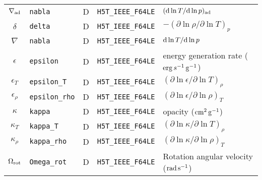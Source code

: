 \documentclass{article}
\newcommand{\diff}{\ensuremath{{\rm d}}}
\newcommand{\cm}{\ensuremath{{\rm cm}}}
\newcommand{\gram}{\ensuremath{{\rm g}}}
\newcommand{\second}{\ensuremath{{\rm s}}}
\newcommand{\erg}{\ensuremath{{\rm erg}}}
\begin{document}
\begin{table}[h!]
\begin{tabular}{|c|l|c|l|l|}
$\nabla_{\rm ad}$  & \texttt{nabla}        & D & \texttt{H5T\_IEEE\_F64LE} & $(\diff \ln T/\diff \ln p)_{\rm ad}$ \\
$\delta$      & \texttt{delta}            & D & \texttt{H5T\_IEEE\_F64LE} & $-(\partial \ln \rho/\partial \ln T)_{p}$  \\
$\nabla$          & \texttt{nabla}        & D & \texttt{H5T\_IEEE\_F64LE} & $\diff \ln T/\diff \ln p$ \\
$\epsilon$        & \texttt{epsilon}      & D &  \texttt{H5T\_IEEE\_F64LE} & energy generation rate ($\erg\,s^{-1}\,\gram^{-1}$) \\
$\epsilon_{T}$    & \texttt{epsilon\_T}   & D &  \texttt{H5T\_IEEE\_F64LE} & $(\partial \ln \epsilon/\partial \ln T)_{\rho}$ \\
$\epsilon_{\rho}$ & \texttt{epsilon\_rho} & D &  \texttt{H5T\_IEEE\_F64LE} & $(\partial \ln \epsilon/\partial \ln \rho)_{T}$ \\
$\kappa$          & \texttt{kappa}       & D &  \texttt{H5T\_IEEE\_F64LE} & opacity ($\cm^{2}\,\gram^{-1}$) \\
$\kappa_{T}$      & \texttt{kappa\_T}     & D &  \texttt{H5T\_IEEE\_F64LE} & $(\partial \ln \kappa/\partial \ln T)_{\rho}$ \\
$\kappa_{\rho}$   & \texttt{kappa\_rho}   & D &  \texttt{H5T\_IEEE\_F64LE} & $(\partial \ln \kappa/\partial \ln \rho)_{T}$ \\
$\Omega_{\rm rot}$ & \texttt{Omega\_rot}   & D & \texttt{H5T\_IEEE\_F64LE} & Rotation angular velocity (${\rm rad}\,\second^{-1}$) \\  \hline
\end{tabular}
\end{table}
\end{document}
